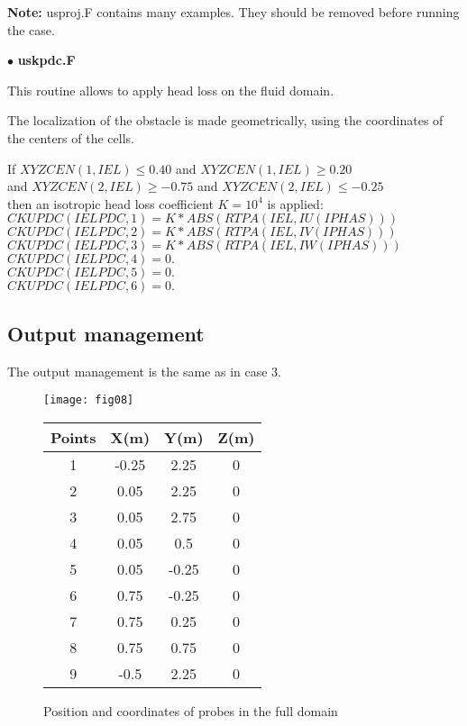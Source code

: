 \textbf{Note:} usproj.F contains many examples. They should be removed before
running the case.


$\bullet$ {\bfseries uskpdc.F}

This routine allows to apply head loss on the fluid domain.

The localization of the obstacle is made geometrically, using the
coordinates of the centers of the cells.


If $XYZCEN(1,IEL) \leq 0.40$ and $XYZCEN(1,IEL) \geq 0.20$ \\
and $XYZCEN(2,IEL) \geq -0.75$ and $XYZCEN(2,IEL) \leq -0.25$\\
then an isotropic head loss coefficient $K = 10^{4}$ is applied:\\

$CKUPDC(IELPDC,1) = K*ABS(RTPA(IEL,IU(IPHAS)))$ \\
$CKUPDC(IELPDC,2) = K*ABS(RTPA(IEL,IV(IPHAS)))$ \\
$CKUPDC(IELPDC,3) = K*ABS(RTPA(IEL,IW(IPHAS)))$ \\
$CKUPDC(IELPDC,4) = 0.$ \\
$CKUPDC(IELPDC,5) = 0.$ \\
$CKUPDC(IELPDC,6) = 0.$

        \subsection{Output management}

The output management is the same as in case 3.

\begin{figure}[htp]
\parbox{8cm}{%
\centerline{\texttt{[image: fig08]}}}
\parbox{7cm}{%
\begin{center}
\begin{tabular}{|c|c|c|c|}
\hline
Points & X(m) & Y(m) & Z(m)\\
\hline
1 & -0.25 & 2.25 & 0 \\
\hline
2 & 0.05 & 2.25 & 0 \\
\hline
3 & 0.05 & 2.75 & 0 \\
\hline
4 & 0.05 & 0.5 & 0 \\
\hline
5 & 0.05 & -0.25 & 0 \\
\hline
6 & 0.75 & -0.25 & 0 \\
\hline
7 & 0.75 & 0.25 & 0 \\
\hline
8 & 0.75 & 0.75 & 0 \\
\hline
9 & -0.5 & 2.25 & 0 \\
\hline
\end{tabular}
\end{center}
}
\caption{Position and coordinates of probes in the full domain}
\label{figante42}
\end{figure}

